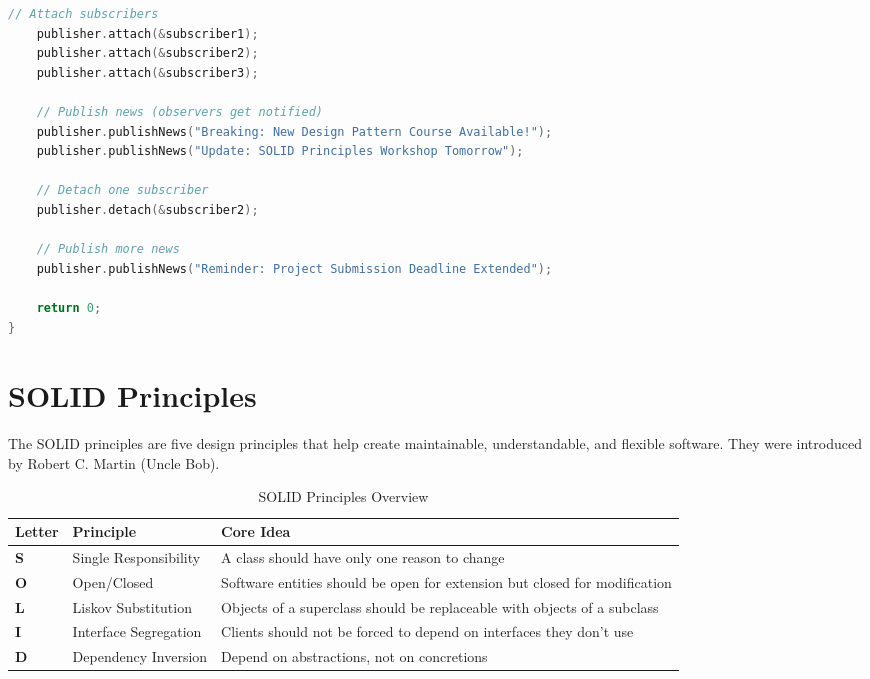 \documentclass[12pt,a4paper]{article}
\newcommand{\principle}[1]{\textbf{\textcolor{primary}{#1}}}
\begin{document}
\begin{lstlisting}[language=C++, caption={Observer Pattern Implementation in C++}, label=lst:observer]
    // Attach subscribers
    publisher.attach(&subscriber1);
    publisher.attach(&subscriber2);
    publisher.attach(&subscriber3);
    
    // Publish news (observers get notified)
    publisher.publishNews("Breaking: New Design Pattern Course Available!");
    publisher.publishNews("Update: SOLID Principles Workshop Tomorrow");
    
    // Detach one subscriber
    publisher.detach(&subscriber2);
    
    // Publish more news
    publisher.publishNews("Reminder: Project Submission Deadline Extended");
    
    return 0;
}
\end{lstlisting}

\section{SOLID Principles}
\label{sec:solid-principles}

The SOLID principles are five design principles that help create maintainable, understandable, and flexible software. They were introduced by Robert C. Martin (Uncle Bob).

\vspace{1em}

\begin{table}[h]
    \centering
    \begin{tabular}{|>{\raggedright\arraybackslash}p{}|>{\raggedright\arraybackslash}p{}|>{\raggedright\arraybackslash}p{}|}
        \hline
        \rowcolor{lightgray}
        \textbf{Letter} & \textbf{Principle} & \textbf{Core Idea} \\
        \hline
        \principle{S} & Single Responsibility & A class should have only one reason to change \\
        \hline
        \principle{O} & Open/Closed & Software entities should be open for extension but closed for modification \\
        \hline
        \principle{L} & Liskov Substitution & Objects of a superclass should be replaceable with objects of a subclass \\
        \hline
        \principle{I} & Interface Segregation & Clients should not be forced to depend on interfaces they don't use \\
        \hline
        \principle{D} & Dependency Inversion & Depend on abstractions, not on concretions \\
        \hline
    \end{tabular}
    \caption{SOLID Principles Overview}
    \label{tab:solid-overview}
\end{table}
\end{document}
